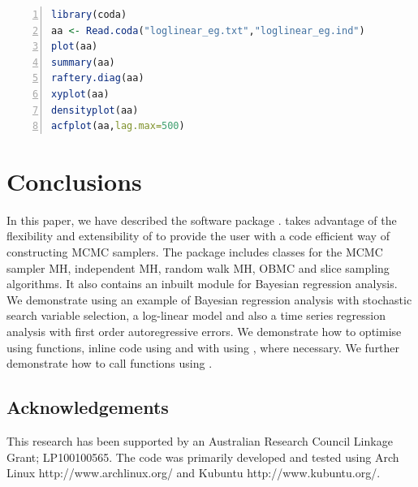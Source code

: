\documentclass[article]{jss}
\begin{document}
\begin{lstlisting}[basicstyle={\scriptsize},language=R,numbers=left]
library(coda)
aa <- Read.coda("loglinear_eg.txt","loglinear_eg.ind")
plot(aa)
summary(aa)
raftery.diag(aa)
xyplot(aa)
densityplot(aa)
acfplot(aa,lag.max=500)

\end{lstlisting}



\section{Conclusions}
\label{sec:Conclusions}

In this paper, we have described the  software
package .   takes advantage of the flexibility
and extensibility of  to provide the user with a code
efficient way of constructing MCMC samplers. The  package
includes classes for the MCMC sampler MH, independent MH, random walk
MH, OBMC and slice sampling algorithms.  It also contains an inbuilt
module for Bayesian regression analysis.  We demonstrate 
using an example of Bayesian regression analysis with stochastic
search variable selection, a log-linear model and also a time series
regression analysis with first order autoregressive errors. We
demonstrate how to optimise  using  functions,
inline  code using  and with
 using , where necessary.  We further
demonstrate how to call  functions using .


\subsection*{Acknowledgements}

This research has been supported by an Australian Research Council
Linkage Grant; LP100100565. The code was primarily developed and
tested using Arch Linux http://www.archlinux.org/ and Kubuntu
http://www.kubuntu.org/.


\end{document}

